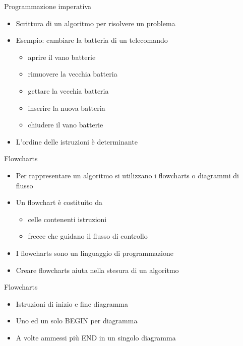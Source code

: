 \documentclass[xcolor=dvipsnames,handout]{beamer}
\begin{document}
\begin{frame}{Programmazione imperativa}
  \vfill
  \begin{itemize}
    \item Scrittura di un \alert{algoritmo} per risolvere un problema
    \vfill
    \item Esempio: cambiare la batteria di un telecomando
    \begin{itemize}
      \item aprire il vano batterie
      \item rimuovere la vecchia batteria
      \item gettare la vecchia batteria
      \item inserire la nuova batteria
      \item chiudere il vano batterie
    \end{itemize}
    \vfill
    \item L'ordine delle istruzioni è determinante
  \end{itemize}
  \vfill
\end{frame}

\begin{frame}{Flowcharts}
  \vfill
  \begin{itemize}
    \item Per rappresentare un algoritmo si utilizzano i \alert{flowcharts} o \alert{diagrammi di flusso}
    \vfill
    \item Un flowchart è costituito da
    \begin{itemize}
      \item celle contenenti istruzioni
      \item frecce che guidano il \alert{flusso di controllo}
    \end{itemize}
    \vfill
    \item I flowcharts sono un linguaggio di programmazione
    \vfill
    \item Creare flowcharts aiuta nella stesura di un algoritmo
  \end{itemize}
  \vfill
\end{frame}

\begin{frame}{Flowcharts}
  \vfill
  \begin{center}\end{center}
  \vfill
  \begin{itemize}
    \item Istruzioni di inizio e fine diagramma
    \vfill
    \item Uno ed un solo \alert{BEGIN} per diagramma
    \vfill
    \item A volte ammessi più \alert{END} in un singolo diagramma
  \end{itemize}
\end{frame}
\end{document}
